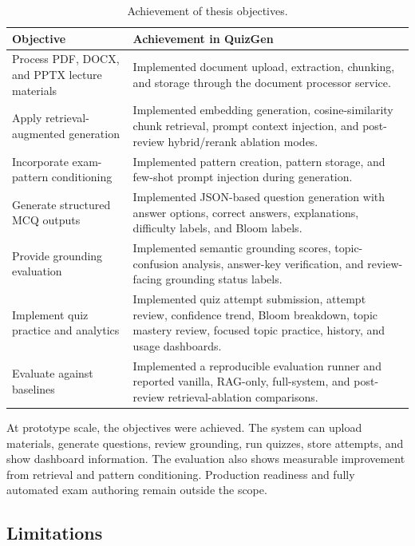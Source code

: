 \documentclass[12pt,a4paper]{article}
\begin{document}
\begin{table}[H]
  \centering
  \singlespacing
  \caption{Achievement of thesis objectives.}
  \label{tab:objective-achievement}
  \begin{tabular}{@{}p{5.0cm}p{7.0cm}@{}}
    \toprule
    \textbf{Objective} & \textbf{Achievement in QuizGen} \\
    \midrule
    Process PDF, DOCX, and PPTX lecture materials &
    Implemented document upload, extraction, chunking, and storage through
    the document processor service. \\
    Apply retrieval-augmented generation &
    Implemented embedding generation, cosine-similarity chunk retrieval,
    prompt context injection, and post-review hybrid/rerank ablation modes. \\
    Incorporate exam-pattern conditioning &
    Implemented pattern creation, pattern storage, and few-shot prompt
    injection during generation. \\
    Generate structured MCQ outputs &
    Implemented JSON-based question generation with answer options, correct
    answers, explanations, difficulty labels, and Bloom labels. \\
    Provide grounding evaluation &
    Implemented semantic grounding scores, topic-confusion analysis,
    answer-key verification, and review-facing grounding status labels. \\
    Implement quiz practice and analytics &
    Implemented quiz attempt submission, attempt review, confidence trend,
    Bloom breakdown, topic mastery review, focused topic practice, history,
    and usage dashboards. \\
    Evaluate against baselines &
    Implemented a reproducible evaluation runner and reported vanilla,
    RAG-only, full-system, and post-review retrieval-ablation comparisons. \\
    \bottomrule
  \end{tabular}
\end{table}

At prototype scale, the objectives were achieved. The system can upload
materials, generate questions, review grounding, run quizzes, store
attempts, and show dashboard information. The evaluation also shows
measurable improvement from retrieval and pattern conditioning. Production
readiness and fully automated exam authoring remain outside the scope.

\subsection{Limitations}
\label{sec:limitations}
\end{document}
